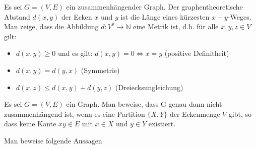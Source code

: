 \documentclass[10pt, a4paper]{exam}
\begin{document}
\begin{questions}

    \question Es sei $G=(V,E)$ ein zusammenhängender Graph. Der graphentheoretische Abstand $d(x, y)$ der Ecken $x$ und $y$ ist die Länge eines kürzesten $x-y$-Weges. Man zeige, dass die Abbildung $d:V^2\rightarrow\mathbb{N}$ eine Metrik ist, d.h. für alle $x, y, z\in V$ gilt:
    \begin{itemize}
        \item $d(x,y)\geq 0$ und es gilt: $d(x,y)=0\Leftrightarrow x = y$ (positive Definitheit)
        \item $d(x,y) = d(y,x)$ (Symmetrie)
        \item $d(x,z)\leq d(x, y) + d(y,z)$ (Dreiecksungleichung)
    \end{itemize}

    \question Es sei $G=(V,E)$ ein Graph. Man beweise, dass G genau dann nicht zusammenhängend ist, wenn es eine Partition $\{X,Y\}$ der Eckenmenge $V$ gibt, so dass keine Kante $xy\in E$ mit $x\in X$ und $y\in Y$ existiert.

    \question Man beweise folgende Aussagen


\end{questions}
\end{document}
